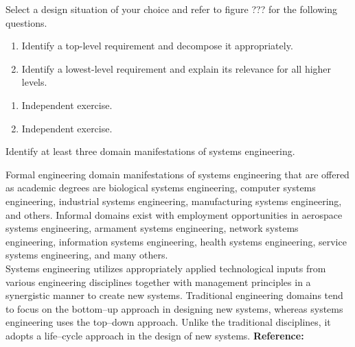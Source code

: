 \begin{exercises}
    \begin{exercise}
    \label{sea-02-18_20}
        Select a design situation of your choice and refer to figure ??? for the following questions.
        \begin{enumerate}[label=\alph*)]
            \item Identify a top-level requirement and decompose it appropriately.
            \item Identify a lowest-level requirement and explain its relevance for all higher levels.
        \end{enumerate}
    \end{exercise}
    \begin{solution}
        \begin{enumerate}[label=\alph*)]
            \item Independent exercise.
            \item Independent exercise.
        \end{enumerate}
    \end{solution}
    
    \begin{exercise}
    \label{sea-02-22}
        Identify at least three domain manifestations of systems engineering.
    \end{exercise}
    \begin{solution}
        Formal engineering domain manifestations of systems engineering that are offered as academic degrees are biological systems engineering, computer systems engineering, industrial systems engineering, manufacturing systems engineering, and others. Informal domains exist with employment opportunities in aerospace systems engineering, armament systems engineering, network systems engineering, information systems engineering, health systems engineering, service systems engineering, and many others. \\
        Systems engineering utilizes appropriately applied technological inputs from various engineering disciplines together with management principles in a synergistic manner to create new systems. Traditional engineering domains tend to focus on the bottom–up approach in designing new systems, whereas systems engineering uses the top–down approach. Unlike the traditional disciplines, it adopts a life–cycle approach in the design of new systems. \textbf{Reference:}
    \end{solution}
    

\end{exercises}
